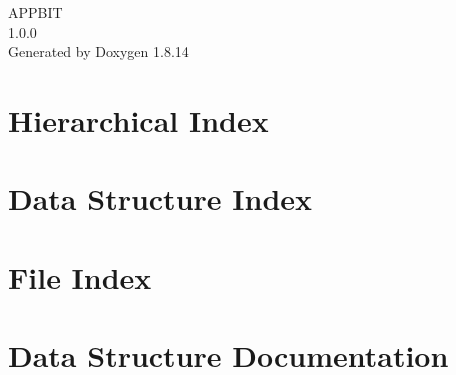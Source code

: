 \documentclass[twoside]{book}
\newcommand{\+}{\discretionary{\mbox{\scriptsize$\hookleftarrow$}}{}{}}
\newcommand{\clearemptydoublepage}{%
  \newpage{\pagestyle{empty}\cleardoublepage}%
}
\begin{document}
\hypersetup{pageanchor=false,
             bookmarksnumbered=true,
             pdfencoding=unicode
            }
\begin{titlepage}
\vspace*{7cm}
\begin{center}%
{\Large A\+P\+P\+B\+IT \\[1ex]\large 1.\+0.\+0 }\\
\vspace*{1cm}
{\large Generated by Doxygen 1.8.14}\\
\end{center}
\end{titlepage}
\clearemptydoublepage
{}
\tableofcontents
\clearemptydoublepage
{}
\hypersetup{pageanchor=true}

\chapter{Hierarchical Index}

\chapter{Data Structure Index}

\chapter{File Index}

\chapter{Data Structure Documentation}




























\end{document}
